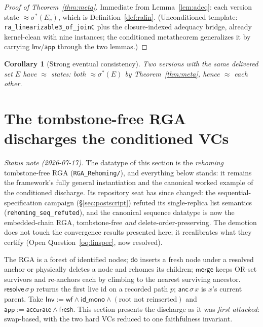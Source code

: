 \documentclass[11pt]{article}
\newtheorem{corollary}[theorem]{Corollary}
\newcommand{\lean}[1]{\texttt{#1}}
\newcommand{\st}{\sigma}
\newcommand{\dodo}{\mathsf{do}}
\newcommand{\merge}{\mathsf{merge}}
\newcommand{\resolve}{\mathsf{resolve}}
\newcommand{\anc}{\mathsf{anc}}
\newcommand{\eqobs}{\approx}
\newcommand{\Inv}{\mathsf{Inv}}
\newcommand{\app}{\mathsf{app}}
\newcommand{\sigmacan}{\st^{\ast}}
\begin{document}
\begin{proof}[Proof of Theorem~\ref{thm:meta}]
Immediate from Lemma~\ref{lem:adeq}: each version state $\eqobs \sigmacan(E_v)$, which is
Definition~\ref{def:ralin}. (Unconditioned template: \lean{ra\_linearizable3\_of\_joinC} plus
the closure-indexed adequacy bridge, already kernel-clean with nine instances; the
conditioned metatheorem generalizes it by carrying $\Inv/\app$ through the two lemmas.)
\end{proof}

\begin{corollary}[Strong eventual consistency]\label{cor:sec}
Two versions with the same delivered set $E$ have $\eqobs$ states: both $\eqobs \sigmacan(E)$
by Theorem~\ref{thm:meta}, hence $\eqobs$ each other.
\end{corollary}

\section{The tombstone-free RGA discharges the conditioned VCs}\label{sec:rgaend}

\noindent\emph{Status note (2026-07-17).} The datatype of this section is
the \emph{rehoming} tombstone-free RGA (\lean{RGA\_Rehoming/}), and
everything below stands: it remains the framework's fully general
instantiation and the canonical worked example of the conditioned
discharge. Its repository seat has since changed: the
sequential-specification campaign (\S\ref{sec:postscript}) refuted its
single-replica list semantics (\lean{rehoming\_seq\_refuted}), and the
canonical sequence datatype is now the embedded-chain RGA, tombstone-free
\emph{and} delete-order-preserving. The demotion does not touch the
convergence results presented here; it recalibrates what they certify
(Open Question~\ref{oq:linspec}, now resolved).

The RGA is a forest of identified nodes; $\dodo$ inserts a fresh node under a resolved anchor
or physically deletes a node and rehomes its children; $\merge$ keeps OR-set survivors and
re-anchors each by climbing to the nearest surviving ancestor. $\resolve\,\st\,p$ returns the
first live id on a recorded path $p$; $\anc\,\st\,x$ is $x$'s current parent. Take
$\Inv := \mathsf{wf} \wedge \mathsf{id\_mono} \wedge (\text{root not reinserted})$ and
$\app := \mathsf{accurate} \wedge \mathsf{fresh}$. This section presents the discharge as
it was \emph{first attacked}: swap-based, with the two hard VCs reduced to one faithfulness
invariant.
\end{document}
